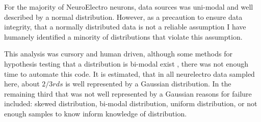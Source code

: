 
%

%    
%
%
%

%
For the majority of NeuroElectro neurons, data sources was uni-modal and well described by a normal distribution. However, as a precaution to ensure data integrity, that a normally distributed data is not a reliable assumption I have humanely identified a minority of distributions that violate this assumption.


This analysis was cursory and human driven, although some methods for hypothesis testing that a distribution is bi-modal exist \cite{maechler2013package}, there was not enough time to automate this code. It is estimated, that in all neurelectro data sampled here, about $2/3rds$ is well represented by a Gaussian distribution. In the remaining third that was not well represented by a Gaussian reasons for failure included: skewed distribution, bi-modal distribution, uniform distribution, or not enough samples to know inform knowledge of distribution.


